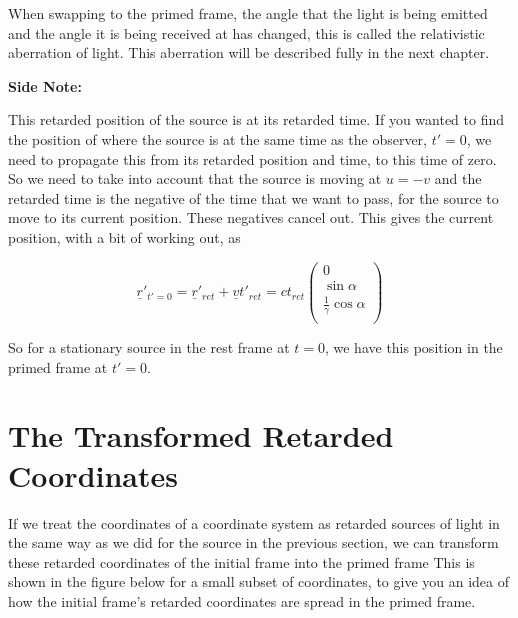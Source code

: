When swapping to the primed frame, the angle that the light is being emitted and the angle it is being received at has changed, this is called the relativistic aberration of light.
This aberration will be described fully in the next chapter.

\textbf{Side Note:}

This retarded position of the source is at its retarded time.
If you wanted to find the position of where the source is at the same time as the observer, $t'=0$, we need to propagate this from its retarded position and time, to this time of zero.
So we need to take into account that the source is moving at $u = -v$ and the retarded time is the negative of the time that we want to pass, for the source to move to its current position.
These negatives cancel out.
This gives the current position, with a bit of working out, as

\begin{equation}
	\label{eq: primed position with synced times}
	\underline{r}'_{t{'} = 0} = \underline{r}'_{ret} + \underline{v}t'_{ret} = {c}{{t}_{ret}}
	\begin{pmatrix}
		0                               \\
		\sin{\alpha}                    \\
		\frac{1}{{\gamma}} \cos{\alpha} \\
	\end{pmatrix}
\end{equation}

So for a stationary source in the rest frame at $t=0$, we have this position in the primed frame at $t'=0$.

\section{The Transformed Retarded Coordinates} \label{sect: Delayed View of Transformed Coordinates}

If we treat the coordinates of a coordinate system as retarded sources of light in the same way as we did for the source in the previous section, we can transform these retarded coordinates of the initial frame into the primed frame
This is shown in the figure below for a small subset of coordinates, to give you an idea of how the initial frame's retarded coordinates are spread in the primed frame.

